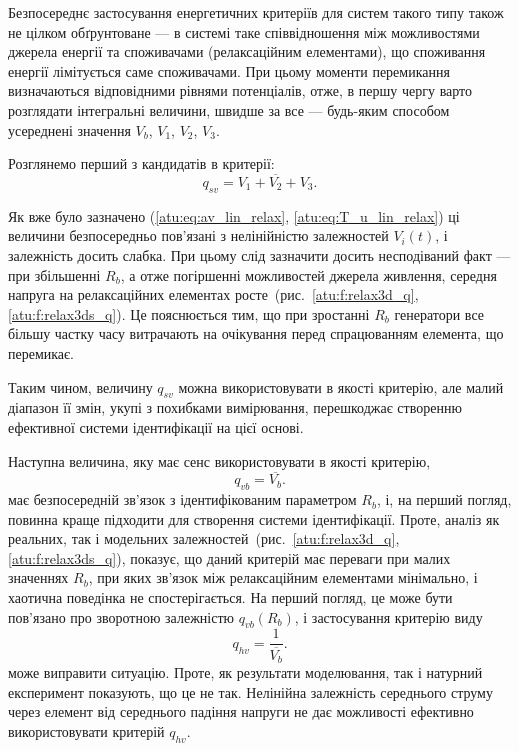Безпосереднє застосування енергетичних критеріїв для систем
такого типу також не цілком обґрунтоване --- в системі таке
співвідношення між можливостями джерела енергії та споживачами
(релаксаційним елементами), що споживання енергії лімітується
саме споживачами. При цьому моменти перемикання визначаються
відповідними рівнями потенціалів, отже, в першу чергу варто
розглядати інтегральні величини, швидше за все --- будь-яким
способом усереднені значення
$ V_b $,
$ V_1 $,
$ V_2 $,
$ V_3 $.

Розглянемо перший з кандидатів в критерії:
\begin{equation}
  q_{sv} = \overline{V_1+V_2+V_3} .
  \label{atu:eq:q_sv_relax}
\end{equation}


Як вже було зазначено (\ref{atu:eq:av_lin_relax}, \ref{atu:eq:T_u_lin_relax}) ці величини
безпосередньо пов'язані з нелінійністю залежностей
$ V_i (t) $, і залежність досить слабка. При цьому слід зазначити
досить несподіваний факт --- при збільшенні
$ R_b $, а отже погіршенні можливостей джерела живлення, середня
напруга на релаксаційних елементах росте~(рис.~\ref{atu:f:relax3d_q},
\ref{atu:f:relax3ds_q}). Це пояснюється тим, що при зростанні
$ R_b $ генератори все більшу частку часу витрачають на очікування
перед спрацюванням  елемента, що перемикає.

Таким чином, величину
$q_{sv}$ можна використовувати в якості критерію, але малий
діапазон її змін, укупі з похибками вимірювання, перешкоджає
створенню ефективної системи ідентифікації на цієї основі.


Наступна величина, яку має сенс використовувати в якості
критерію,
%
\begin{equation}
  q_{vb} = \overline{V_b} .
  \label{atu:eq:q_vb_relax}
\end{equation}
%
має безпосередній зв'язок з ідентифікованим параметром
$ R_b $, і, на перший погляд, повинна краще підходити для створення
системи ідентифікації. Проте, аналіз як реальних, так і модельних
залежностей~(рис.~\ref{atu:f:relax3d_q}, \ref{atu:f:relax3ds_q}), показує, що даний
критерій має переваги при малих значеннях
$ R_b $, при яких зв'язок між релаксаційним елементами мінімально, і
хаотична поведінка не спостерігається. На перший погляд,
це може бути пов'язано про зворотною залежністю
$ q_{vb} (R_b) $, і застосування критерію виду
%
\begin{equation}
  q_{hv} = \frac{1}{\overline{V_b}} .
  \label{atu:eq:q_hb_relax}
\end{equation}
%
може виправити ситуацію. Проте, як результати моделювання,
так і натурний експеримент показують, що це не так. Нелінійна
залежність середнього струму через елемент від середнього
падіння напруги не дає можливості ефективно використовувати критерій
$q_{hv}$.

